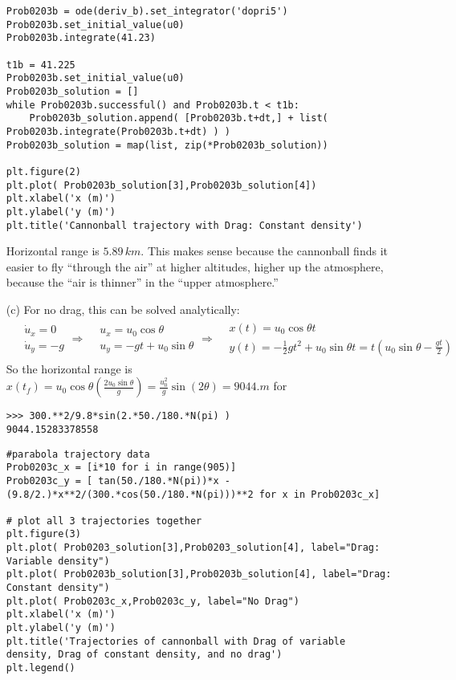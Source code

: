 \documentclass[10pt]{amsart}
\begin{document}
\begin{multicols*}{2}
\begin{enumerate}
\begin{lstlisting}
Prob0203b = ode(deriv_b).set_integrator('dopri5')
Prob0203b.set_initial_value(u0)
Prob0203b.integrate(41.23)

t1b = 41.225
Prob0203b.set_initial_value(u0)
Prob0203b_solution = []
while Prob0203b.successful() and Prob0203b.t < t1b:
    Prob0203b_solution.append( [Prob0203b.t+dt,] + list( Prob0203b.integrate(Prob0203b.t+dt) ) )
Prob0203b_solution = map(list, zip(*Prob0203b_solution))

plt.figure(2)
plt.plot( Prob0203b_solution[3],Prob0203b_solution[4])
plt.xlabel('x (m)')
plt.ylabel('y (m)')
plt.title('Cannonball trajectory with Drag: Constant density')
\end{lstlisting}

Horizontal range is $5.89\, km$.  This makes sense because the cannonball finds it easier to fly ``through the air'' at higher altitudes, higher up the atmosphere, because the ``air is thinner'' in the ``upper atmosphere.''  
\item[(c)] For no drag, this can be solved analytically:
\[
\begin{gathered}
  \begin{aligned}
    & \dot{u}_x = 0 \\ 
    & \dot{u}_y = -g 
\end{aligned} \Longrightarrow 
\begin{aligned}
  & u_x = u_0 \cos{\theta} \\ 
  & u_y = -gt + u_0 \sin{\theta}
\end{aligned} \Longrightarrow 
\begin{aligned}
  & x(t) = u_0 \cos{\theta} t \\ 
  & y(t) = -\frac{1}{2} gt^2 + u_0 \sin{\theta} t = t(u_0 \sin{\theta} - \frac{gt}{2} )
\end{aligned}
\end{gathered}
\]
So the horizontal range is $x(t_f) = u_0 \cos{\theta} \left( \frac{2u_0 \sin{\theta}}{g} \right) = \frac{u_0^2}{g} \sin{(2\theta)} = 9044.m$ for
\begin{lstlisting}
>>> 300.**2/9.8*sin(2.*50./180.*N(pi) )
9044.15283378558
\end{lstlisting}

\begin{lstlisting}
#parabola trajectory data
Prob0203c_x = [i*10 for i in range(905)]
Prob0203c_y = [ tan(50./180.*N(pi))*x - (9.8/2.)*x**2/(300.*cos(50./180.*N(pi)))**2 for x in Prob0203c_x]

# plot all 3 trajectories together
plt.figure(3)
plt.plot( Prob0203_solution[3],Prob0203_solution[4], label="Drag: Variable density")
plt.plot( Prob0203b_solution[3],Prob0203b_solution[4], label="Drag: Constant density")
plt.plot( Prob0203c_x,Prob0203c_y, label="No Drag")
plt.xlabel('x (m)')
plt.ylabel('y (m)')
plt.title('Trajectories of cannonball with Drag of variable density, Drag of constant density, and no drag')
plt.legend()
\end{lstlisting}


\end{enumerate}
\end{multicols*}
\end{document}
